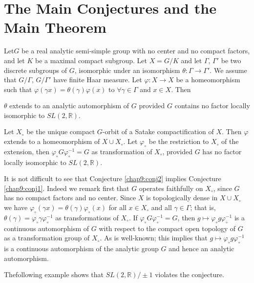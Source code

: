 
\chapter{The Main Conjectures and the Main Theorem}\label{chap9}

Let\pageoriginale $G$ be a real analytic semi-simple group with no
center and no compact factors, and let $K$ be a maximal compact
subgroup. Let $X= G/K$ and let $\Gamma$, $\Gamma'$ be two discrete
subgroups of $G$, isomorphic under an isomorphism $\theta: \Gamma \to
\Gamma'$. We assume that $G/\Gamma$, $G/\Gamma'$ have finite Haar
measure. Let $\varphi:X \to X$ be a homeomorphism such that $\varphi
(\gamma x)= \theta (\gamma) \varphi (x)$ to $\forall \gamma \in \Gamma$
and $x \in X$. Then

\begin{conj}\label{chap9:conj1}
  $\theta$ extends to an analytic automorphism of $G$ provided $G$
  contains no factor locally isomorphic to $SL (2, \mathbb{R})$.
\end{conj}

\begin{conj}\label{chap9:conj2}
  Let $X_\circ$ be the unique compact $G$-orbit of a Satake
  compactification of $X$. Then $\varphi$ extends to a homeomorphism
  of $X \cup X_\circ$. Let $\varphi_\circ$ be the restriction to
  $X_\circ$ of the extension, then $\varphi_\circ G
  \varphi_\circ^{-1}=G$ as transformation of $X_\circ$, provided $G$
  has no factor locally isomorphic to $SL (2, \mathbb{R})$. 
\end{conj}

It is not difficult to see that Conjecture \ref{chap9:conj2} implies
Conjecture \ref{chap9:conj1}. Indeed we remark first that $G$ operates
faithfully on $X_\circ$, since $G$ has no compact factors and no
center. Since $X$ is topologically dense in $X \cup X_\circ$ we have
$\varphi_\circ (\gamma x)= \theta (\gamma) \varphi_\circ (x)$ for all
$x \in X_\circ$ and all $\gamma \in \Gamma$; that is, $\theta
(\gamma)= \varphi_\circ \gamma \varphi_\circ^{-1}$ as transformations
of $X_\circ$. If $\varphi_\circ G \varphi_\circ^{-1}=G$, then $g
\mapsto \varphi_\circ g \varphi_\circ^{-1}$ is a continuous
automorphism of $G$ with respect to the compact open topology of $G$
as a transformation group of $X_\circ$. As is well-known; this implies
that $g \mapsto \varphi_\circ g\varphi_\circ^{-1}$ is a continuous
automorphism of the analytic group $G$ and hence an analytic
automorphism. 

The\pageoriginale following example shows that $SL (2, \mathbb{R})/\pm
1$ violates the conjecture.

